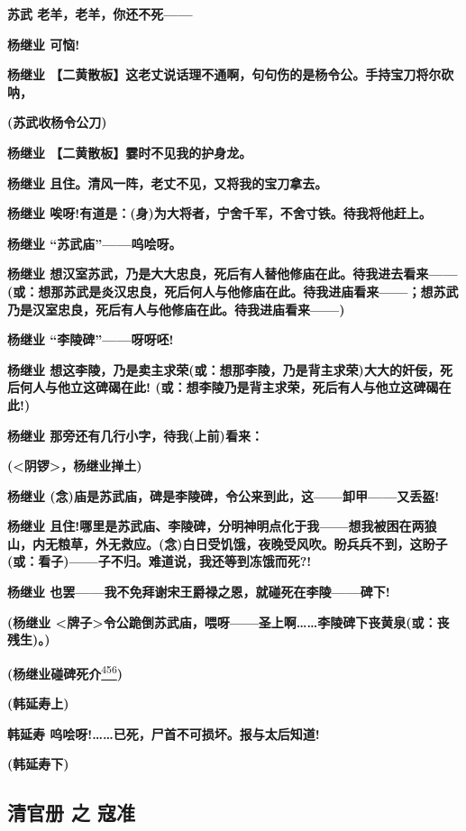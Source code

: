 \textbf{苏武 老羊，老羊，你还不死------}

\textbf{杨继业 可恼!}

\textbf{杨继业
【二黄散板】这老丈说话理不通啊，句句伤的是杨令公。手持宝刀将尔砍呐，}

\textbf{(苏武收杨令公刀)}

\textbf{杨继业 【二黄散板】霎时不见我的护身龙。　}

\textbf{杨继业 且住。清风一阵，老丈不见，又将我的宝刀拿去。}

\textbf{杨继业
唉呀!有道是：(身)为大将者，宁舍千军，不舍寸铁。待我将他赶上。}

\textbf{杨继业 ``苏武庙''------呜哙呀。}

\textbf{杨继业
想汉室苏武，乃是大大忠良，死后有人替他修庙在此。待我进去看来------(或：想那苏武是炎汉忠良，死后何人与他修庙在此。待我进庙看来------；想苏武乃是汉室忠良，死后有人与他修庙在此。待我进庙看来------)}

\textbf{杨继业 ``李陵碑''------呀呀呸!}

\textbf{杨继业
想这李陵，乃是卖主求荣(或：想那李陵，乃是背主求荣)大大的奸佞，死后何人与他立这碑碣在此!
(或：想李陵乃是背主求荣，死后有人与他立这碑碣在此!)}

\textbf{杨继业 那旁还有几行小字，待我(上前)看来：}

\textbf{(\textless{}阴锣\textgreater{}，杨继业掸土)}

\textbf{杨继业
(念)庙是苏武庙，碑是李陵碑，令公来到此，这------卸甲------又丢盔!}

\textbf{杨继业
且住!哪里是苏武庙、李陵碑，分明神明点化于我------想我被困在两狼山，内无粮草，外无救应。(念)白日受饥饿，夜晚受风吹。盼兵兵不到，这盼子(或：看子)------子不归。难道说，我还等到冻饿而死?!}

\textbf{杨继业
也罢------我不免拜谢宋王爵禄之恩，就碰死在李陵------碑下!}

\textbf{(杨继业
\textless{}牌子\textgreater{}令公跪倒苏武庙，喂呀------圣上啊\ldots{}\ldots{}李陵碑下丧黄泉(或：丧残生)。)}

\textbf{(杨继业碰碑死介}\protect\hyperlink{fn456}{\textsuperscript{456}}\textbf{)}

\textbf{(韩延寿上)}

\textbf{韩延寿 呜哙呀!\ldots{}\ldots{}已死，尸首不可损坏。报与太后知道!}

\textbf{(韩延寿下)}

\hypertarget{ux6e05ux5b98ux518c-ux4e4b-ux5bc7ux51c6}{%
\subsection{清官册 之
寇准}\label{ux6e05ux5b98ux518c-ux4e4b-ux5bc7ux51c6}}

